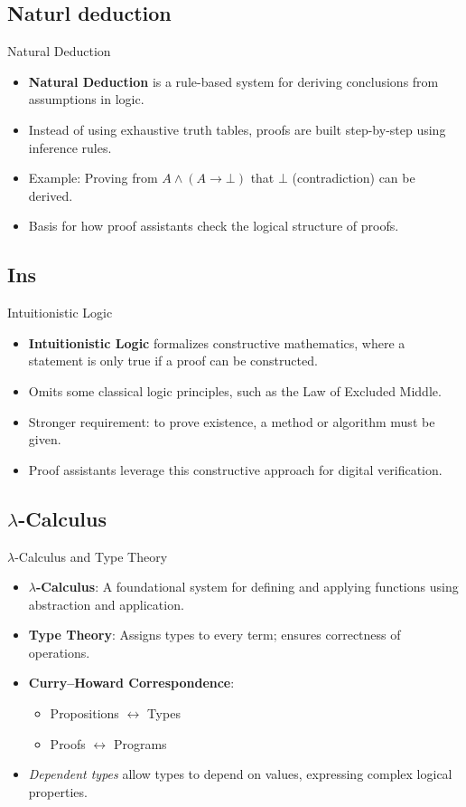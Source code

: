 \documentclass[aspectratio=169, 12pt]{beamer}
\begin{document}
\subsection*{Naturl deduction}
\begin{frame}{Natural Deduction}
\begin{itemize}
    \item \textbf{Natural Deduction} is a rule-based system for deriving conclusions from assumptions in logic.
    \item Instead of using exhaustive truth tables, proofs are built step-by-step using inference rules.
    \item Example: Proving from $A \land (A \rightarrow \bot)$ that $\bot$ (contradiction) can be derived.
    \item Basis for how proof assistants check the logical structure of proofs.
\end{itemize}
\end{frame}
\subsection*{Ins}
\begin{frame}{Intuitionistic Logic}
\begin{itemize}
    \item \textbf{Intuitionistic Logic} formalizes constructive mathematics, where a statement is only true if a proof can be constructed.
    \item Omits some classical logic principles, such as the Law of Excluded Middle.
    \item Stronger requirement: to prove existence, a method or algorithm must be given.
    \item Proof assistants leverage this constructive approach for digital verification.
\end{itemize}
\end{frame}
\subsection*{$\lambda$-Calculus}
\begin{frame}{$\lambda$-Calculus and Type Theory}
\begin{itemize}
    \item \textbf{$\lambda$-Calculus}: A foundational system for defining and applying functions using abstraction and application.
    \item \textbf{Type Theory}: Assigns types to every term; ensures correctness of operations.
    \item \textbf{Curry--Howard Correspondence}: 
    \begin{itemize}
        \item Propositions $\leftrightarrow$ Types
        \item Proofs $\leftrightarrow$ Programs
    \end{itemize}
    \item \emph{Dependent types} allow types to depend on values, expressing complex logical properties.
\end{itemize}
\end{frame}
\end{document}
